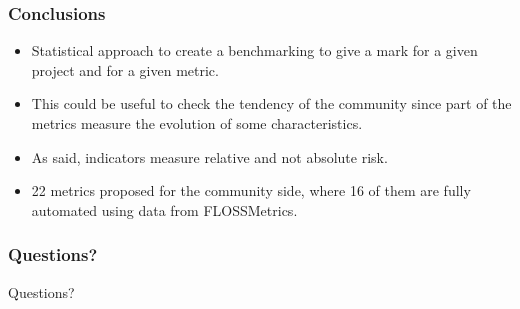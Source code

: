 \documentclass{beamer}
\begin{document}
\begin{frame}
\frametitle{Conclusions}
\begin{center}
\begin{itemize}
\item Statistical approach to create a benchmarking to give a mark for a given project and for a given metric.
\item This could be useful to check the tendency of the community since part of the metrics measure the evolution of some characteristics.
\item As said, indicators measure relative and not absolute risk. 
\item 22 metrics proposed for the community side, where 16 of them are fully automated using data 
from FLOSSMetrics.
\end{itemize}
\end{center}
\end{frame}



\begin{frame}
\frametitle{Questions?}
\begin{center}
Questions?\\
\end{center}
\end{frame}
\end{document}
